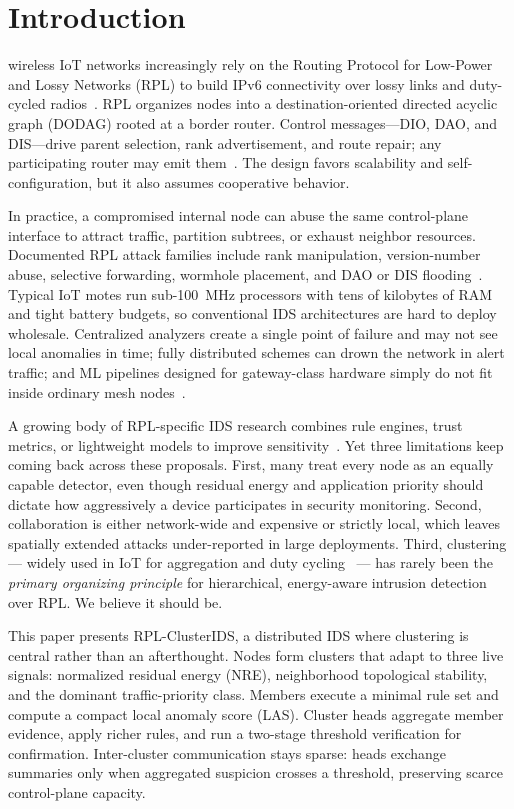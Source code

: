 \section{Introduction}
\label{sec:intro}

 wireless IoT networks increasingly rely on the Routing Protocol for Low-Power and Lossy Networks (RPL) to build IPv6 connectivity over lossy links and duty-cycled radios~\cite{rfc6550,baronti2007}.
RPL organizes nodes into a destination-oriented directed acyclic graph (DODAG) rooted at a border router.
Control messages---DIO, DAO, and DIS---drive parent selection, rank advertisement, and route repair; any participating router may emit them~\cite{rfc6550}.
The design favors scalability and self-configuration, but it also assumes cooperative behavior.

In practice, a compromised internal node can abuse the same control-plane interface to attract traffic, partition subtrees, or exhaust neighbor resources.
Documented RPL attack families include rank manipulation, version-number abuse, selective forwarding, wormhole placement, and DAO or DIS flooding~\cite{mayzaud2016,raza2017,rfc7416}.
Typical IoT motes run sub-100~MHz processors with tens of kilobytes of RAM and tight battery budgets, so conventional IDS architectures are hard to deploy wholesale.
Centralized analyzers create a single point of failure and may not see local anomalies in time; fully distributed schemes can drown the network in alert traffic; and ML pipelines designed for gateway-class hardware simply do not fit inside ordinary mesh nodes~\cite{faheem2013,sfar2018}.

A growing body of RPL-specific IDS research combines rule engines, trust metrics, or lightweight models to improve sensitivity~\cite{raza2017,hindy2020,garg2023}.
Yet three limitations keep coming back across these proposals.
First, many treat every node as an equally capable detector, even though residual energy and application priority should dictate how aggressively a device participates in security monitoring.
Second, collaboration is either network-wide and expensive or strictly local, which leaves spatially extended attacks under-reported in large deployments.
Third, clustering --- widely used in IoT for aggregation and duty cycling~\cite{heinzelman2000,heinzelman2002} --- has rarely been the \emph{primary organizing principle} for hierarchical, energy-aware intrusion detection over RPL. We believe it should be.

This paper presents RPL-ClusterIDS, a distributed IDS where clustering is central rather than an afterthought.
Nodes form clusters that adapt to three live signals: normalized residual energy (NRE), neighborhood topological stability, and the dominant traffic-priority class.
Members execute a minimal rule set and compute a compact local anomaly score (LAS).
Cluster heads aggregate member evidence, apply richer rules, and run a two-stage threshold verification for confirmation.
Inter-cluster communication stays sparse: heads exchange summaries only when aggregated suspicion crosses a threshold, preserving scarce control-plane capacity.

